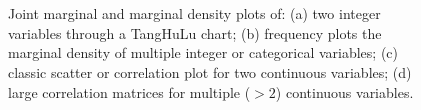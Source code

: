 \documentclass{bioinfo}
\begin{document}
\begin{figure}[ht]
 \\
 \\
\caption{Joint marginal and marginal density plots of: (a) two integer variables through a TangHuLu chart; (b) frequency plots the marginal density of multiple integer or categorical variables; (c) classic scatter or correlation plot for two continuous variables; (d) large correlation matrices for multiple ($> 2$) continuous variables.
}
\label{fig:4tabs}
\end{figure}
\end{document}
